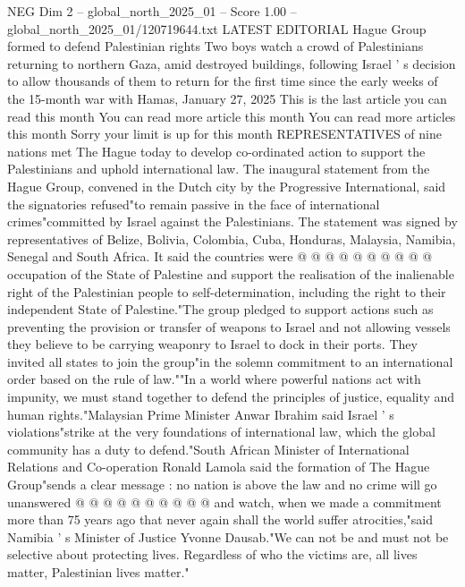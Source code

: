 \begin{textsample}{NEG Dim 2 – global\_north\_2025\_01 – Score 1.00 – global\_north\_2025\_01/120719644.txt}  \label{ex:f2_neg_046}
LATEST EDITORIAL Hague Group formed to defend Palestinian rights Two boys watch a crowd of Palestinians returning to northern Gaza, amid destroyed buildings, following Israel ' s decision to allow thousands of them to return for the first time since the early weeks of the 15-month war with Hamas, January 27, 2025 This is the last article you can read this month You can read more article this month You can read more articles this month Sorry your limit is up for this month REPRESENTATIVES of nine nations met The Hague today to develop co-ordinated action to support the Palestinians and uphold international law.
The inaugural statement from the Hague Group, convened in the Dutch city by the Progressive International, said the signatories refused"to remain passive in the face of international crimes"committed by Israel against the Palestinians.
The statement was signed by representatives of Belize, Bolivia, Colombia, Cuba, Honduras, Malaysia, Namibia, Senegal and South Africa.
It said the countries were @ @ @ @ @ @ @ @ @ @ occupation of the State of Palestine and support the realisation of the inalienable right of the Palestinian people to self-determination, including the right to their independent State of Palestine."The group pledged to support actions such as preventing the provision or transfer of weapons to Israel and not allowing vessels they believe to be carrying weaponry to Israel to dock in their ports.
They invited all states to join the group"in the solemn commitment to an international order based on the rule of law.""In a world where powerful nations act with impunity, we must stand together to defend the principles of justice, equality and human rights."Malaysian Prime Minister Anwar Ibrahim said Israel ' s violations"strike at the very foundations of international law, which the global community has a duty to defend."South African Minister of International Relations and Co-operation Ronald Lamola said the formation of The Hague Group"sends a clear message : no nation is above the law and no crime will go unanswered @ @ @ @ @ @ @ @ @ @ and watch, when we made a commitment more than 75 years ago that never again shall the world suffer atrocities,"said Namibia ' s Minister of Justice Yvonne Dausab."We can not be and must not be selective about protecting lives.
Regardless of who the victims are, all lives matter, Palestinian lives matter."

\end{textsample}

